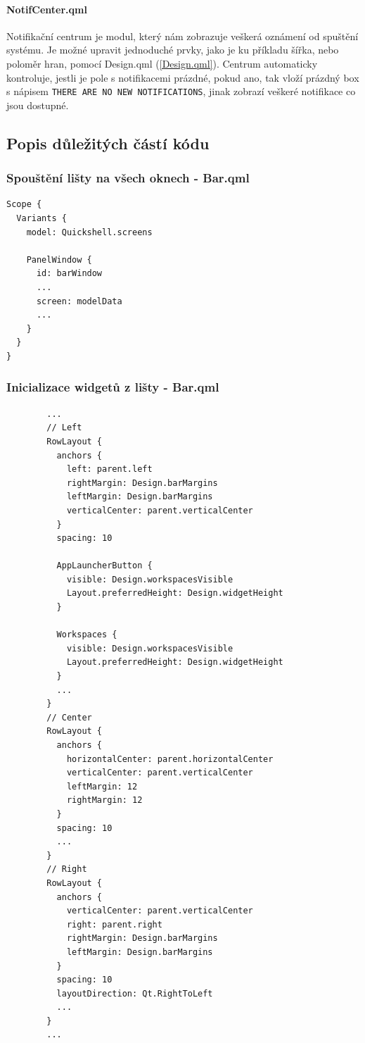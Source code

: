 \documentclass[12pt,a4paper]{article}
\begin{document}
\paragraph{NotifCenter.qml}
\label{NotifCenter.qml}
Notifikační centrum je modul, který nám zobrazuje veškerá oznámení od spuštění systému. Je možné upravit jednoduché prvky,
jako je ku příkladu šířka, nebo poloměr hran, pomocí Design.qml (\ref{Design.qml}). Centrum automaticky kontroluje, jestli
je pole s notifikacemi prázdné, pokud ano, tak vloží prázdný box s nápisem \verb|THERE ARE NO NEW NOTIFICATIONS|, jinak 
zobrazí veškeré notifikace co jsou dostupné.


\clearpage
\subsection{Popis důležitých částí kódu}
\subsubsection{Spouštění lišty na všech oknech - Bar.qml}
\label{Bar.qml 0}
\begin{lstlisting}
Scope {
  Variants {
    model: Quickshell.screens

    PanelWindow {
      id: barWindow
      ...
      screen: modelData
      ...
    }
  }
}
\end{lstlisting}

\clearpage
\subsubsection{Inicializace widgetů z lišty - Bar.qml}
\label{Bar.qml 1}
\begin{lstlisting}
        ...
        // Left
        RowLayout {
          anchors {
            left: parent.left
            rightMargin: Design.barMargins
            leftMargin: Design.barMargins
            verticalCenter: parent.verticalCenter
          }
          spacing: 10

          AppLauncherButton {
            visible: Design.workspacesVisible
            Layout.preferredHeight: Design.widgetHeight
          }
          
          Workspaces {
            visible: Design.workspacesVisible
            Layout.preferredHeight: Design.widgetHeight
          }
          ...
        }
        // Center
        RowLayout {
          anchors {
            horizontalCenter: parent.horizontalCenter
            verticalCenter: parent.verticalCenter
            leftMargin: 12
            rightMargin: 12
          }
          spacing: 10
          ...
        }
        // Right
        RowLayout {
          anchors {
            verticalCenter: parent.verticalCenter
            right: parent.right
            rightMargin: Design.barMargins
            leftMargin: Design.barMargins
          }
          spacing: 10
          layoutDirection: Qt.RightToLeft
          ...
        }
        ...
\end{lstlisting}
\end{document}

